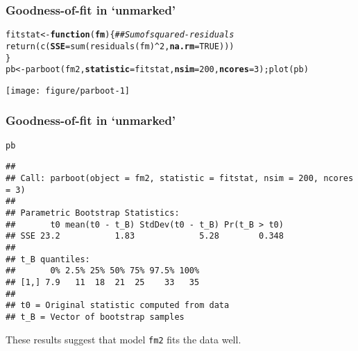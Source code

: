 \documentclass[color=usenames,dvipsnames]{beamer}\usepackage[]{graphicx}\usepackage[]{xcolor}
\makeatletter
\newcommand{\hlnum}[1]{\textcolor[rgb]{0.69,0.494,0}{#1}}%
\newcommand{\hlcom}[1]{\textcolor[rgb]{0.514,0.506,0.514}{\textit{#1}}}%
\newcommand{\hlopt}[1]{\textcolor[rgb]{0,0,0}{#1}}%
\newcommand{\hlstd}[1]{\textcolor[rgb]{0,0,0}{#1}}%
\newcommand{\hlkwa}[1]{\textcolor[rgb]{0,0,0}{\textbf{#1}}}%
\newcommand{\hlkwb}[1]{\textcolor[rgb]{0,0.341,0.682}{#1}}%
\newcommand{\hlkwc}[1]{\textcolor[rgb]{0,0,0}{\textbf{#1}}}%
\newcommand{\hlkwd}[1]{\textcolor[rgb]{0.004,0.004,0.506}{#1}}%
\newenvironment{kframe}{%
 \def\at@end@of@kframe{}%
 \ifinner\ifhmode%
  \def\at@end@of@kframe{\end{minipage}}%
  \begin{minipage}{\columnwidth}%
 \fi\fi%
 \def\FrameCommand##1{\hskip\@totalleftmargin \hskip-\fboxsep
 \colorbox{shadecolor}{##1}\hskip-\fboxsep
     \hskip-\linewidth \hskip-\@totalleftmargin \hskip\columnwidth}%
 \MakeFramed {\advance\hsize-\width
   \@totalleftmargin\z@ \linewidth\hsize
   \@setminipage}}%
 {\par\unskip\endMakeFramed%
 \at@end@of@kframe}
\newenvironment{knitrout}{}{} %
\newcommand{\inr}[1]{\colorbox{inlinecolor}{\texttt{#1}}}
\makeatother
\begin{document}
\begin{frame}[fragile]
  \frametitle{Goodness-of-fit in `unmarked'}
\begin{knitrout}\scriptsize
{}\color{fgcolor}\begin{kframe}
\begin{alltt}
\hlstd{fitstat} \hlkwb{<-} \hlkwa{function}\hlstd{(}\hlkwc{fm}\hlstd{) \{} \hlcom{## Sum of squared-residuals}
    \hlkwd{return}\hlstd{(}\hlkwd{c}\hlstd{(}\hlkwc{SSE}\hlstd{=}\hlkwd{sum}\hlstd{(}\hlkwd{residuals}\hlstd{(fm)}\hlopt{^}\hlnum{2}\hlstd{,} \hlkwc{na.rm}\hlstd{=}\hlnum{TRUE}\hlstd{)))}
\hlstd{\}}
\hlstd{pb} \hlkwb{<-} \hlkwd{parboot}\hlstd{(fm2,} \hlkwc{statistic}\hlstd{=fitstat,} \hlkwc{nsim}\hlstd{=}\hlnum{200}\hlstd{,} \hlkwc{ncores}\hlstd{=}\hlnum{3}\hlstd{);} \hlkwd{plot}\hlstd{(pb)}
\end{alltt}
\end{kframe}

{\centering \texttt{[image: figure/parboot-1]} 

}


\end{knitrout}
\end{frame}



\begin{frame}[fragile]
  \frametitle{Goodness-of-fit in `unmarked'}
\begin{knitrout}\scriptsize
{}\color{fgcolor}\begin{kframe}
\begin{alltt}
\hlstd{pb}
\end{alltt}
\begin{verbatim}
## 
## Call: parboot(object = fm2, statistic = fitstat, nsim = 200, ncores = 3)
## 
## Parametric Bootstrap Statistics:
##       t0 mean(t0 - t_B) StdDev(t0 - t_B) Pr(t_B > t0)
## SSE 23.2           1.83             5.28        0.348
## 
## t_B quantiles:
##       0% 2.5% 25% 50% 75% 97.5% 100%
## [1,] 7.9   11  18  21  25    33   35
## 
## t0 = Original statistic computed from data
## t_B = Vector of bootstrap samples
\end{verbatim}
\end{kframe}
\end{knitrout}
\vfill
These results suggest that model \inr{fm2} fits the data well.
\end{frame}
\end{document}
